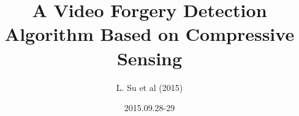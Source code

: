 


\title[A Video Forgery Detection Algorithm Based on Compressive Sensing]
{A Video Forgery Detection Algorithm Based on Compressive Sensing}
\author[L. Su et al (2015)]
{L. Su et al (2015)}
\date{2015.09.28-29}













